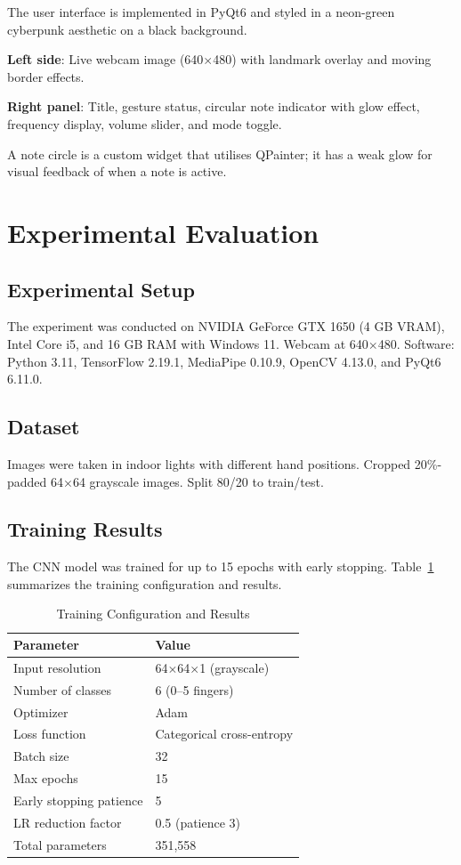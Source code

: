 \documentclass[conference]{IEEEtran}
\begin{document}
The user interface is implemented in PyQt6 and styled in a neon-green cyberpunk aesthetic on a black background.

\textbf{Left side}: Live webcam image (640$\times$480) with landmark overlay and moving border effects.

\textbf{Right panel}: Title, gesture status, circular note indicator with glow effect, frequency display, volume slider, and mode toggle.

A note circle is a custom widget that utilises QPainter; it has a weak glow for visual feedback of when a note is active.

\section{Experimental Evaluation}

\subsection{Experimental Setup}

The experiment was conducted on NVIDIA GeForce GTX 1650 (4 GB VRAM), Intel Core i5, and 16 GB RAM with Windows 11. Webcam at 640$\times$480. Software: Python 3.11, TensorFlow 2.19.1, MediaPipe 0.10.9, OpenCV 4.13.0, and PyQt6 6.11.0.

\subsection{Dataset}

Images were taken in indoor lights with different hand positions. Cropped 20\%-padded 64$\times$64 grayscale images. Split 80/20 to train/test.

\subsection{Training Results}

The CNN model was trained for up to 15 epochs with early stopping. Table~\ref{tab:training_results} summarizes the training configuration and results.

\begin{table}[htbp]
\caption{Training Configuration and Results}
\label{tab:training_results}
\centering
\begin{tabular}{ll}
\toprule
\textbf{Parameter} & \textbf{Value} \\
\midrule
Input resolution & 64$\times$64$\times$1 (grayscale) \\
Number of classes & 6 (0--5 fingers) \\
Optimizer & Adam \\
Loss function & Categorical cross-entropy \\
Batch size & 32 \\
Max epochs & 15 \\
Early stopping patience & 5 \\
LR reduction factor & 0.5 (patience 3) \\
Total parameters & 351,558 \\
\bottomrule
\end{tabular}
\end{table}
\end{document}
